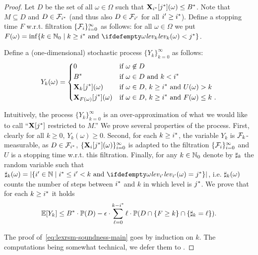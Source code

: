 \begin{proof}
Let $D$ be the set of all $\omega\in \Omega$ such that 
$\mathbf{X}_{{i}^*}[{j}^*](\omega)\leq {B}^*$. Note that $M \subseteq D$ and $D\in 
\mathcal{F}_{{i}^*}$ (and thus also $D\in \mathcal{F}_{i'}$ for all $i'\geq {i}^*$). 
Define a stopping time $F$ w.r.t. filtration $\{\mathcal{F}_i\}_{i=0}^{\infty}$ as follows: for all $\omega \in \Omega$ 
we put 
$F(\omega)=\inf\{k\in \Nset_0 \mid k\geq \fixn{i} \text{ and }
\levelrank{\omega}{k} < \fixn{j} \}$.

Define a 
(one-dimensional) stochastic process $\{Y_k\}_{k=0}^{\infty}$ as 
follows:
$$
Y_k(\omega) = \begin{dcases}
0 & \text{if $\omega \not\in D$}\\
{B}^* & \text{if $\omega \in D$ and $k<{i}^*$ }\\
\mathbf{X}_{k}[{j}^*](\omega) & \text{if $\omega \in D$, $k\geq {i}^*$ and 
$U(\omega)>k$ 
}\\
\mathbf{X}_{F(\omega)}[{j}^*](\omega) & \text{if $\omega\in D$, $k\geq 
{i}^*$ and 
$F(\omega)\leq k$ }.
\end{dcases}
$$

Intuitively, the process $\{Y_k\}_{k=0}^{\infty}$ is an over-approximation of what we would like to call ``$\mathbf{X}[{j}^*]$ restricted to $M$.''
We prove several properties of the process. 
First, clearly for all $k\geq 0$, $Y_k(\omega)\geq 0$. Second, for each $k\geq {i}^*$, the variable $Y_k$ is $\mathcal{F}_k$-measurable, as $D\in \mathcal{F}_{{i}^*}$, $\{\mathbf{X}_{i}[{j}^*](\omega)\}_{i=0}^{\infty}$ is adapted to the filtration $\{\mathcal{F}_i\}_{i=0}^{\infty}$ and $U$ is a stopping time w.r.t. this filtration. Finally, for any $k\in \mathbb{N}_0$ denote by 
$\sharp_k$ the random variable such that $\noofdec_k(\omega) = |\{i'\in 
\Nset\mid \fixn{i} \leq i' < k \text{ and } \levelrank{\omega}{i'}=\fixn{j}\} |$, i.e. $\sharp_k(\omega)$ counts the number of steps between ${i}^*$ and $k$ in which level is ${j}^*$.
We prove
that for each $k\geq {i}^*$ 
it holds 
\begin{equation}
\label{eq:lexrsm-soundness-main}
\mathbb{E}[Y_k]\leq {B}^*\cdot \mathbb{P}(D) - \epsilon\cdot\sum_{\ell=0}^{k-{i}^*} \ell\cdot\mathbb{P}(D 
\cap \{F\geq k\} \cap \{\sharp_k 
= 
\ell\}).
\end{equation}

The proof of~\eqref{eq:lexrsm-soundness-main} goes by induction on $k$. The computations being somewhat technical, we defer them to \AppendixMaterial. 


\end{proof}
